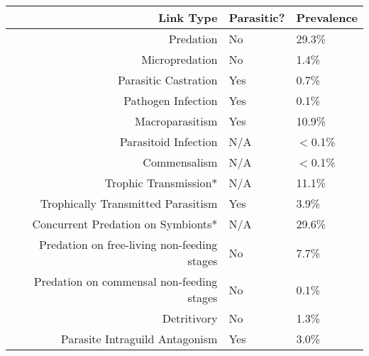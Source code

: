 \documentclass[/home/nkappler/Research/Dissertation/dissertation.tex]{subfiles}
\begin{document}
\begin{bibunit}
\begin{table}
    \centering
    \begin{tabular}{r l l}
        \toprule
        Link Type                                   & Parasitic?    & Prevalence\\
        \midrule
        Predation                                   & No            &29.3\%\\%
        Micropredation                              & No            &1.4\%\\%
        Parasitic Castration                        & Yes           &0.7\%\\%
        Pathogen Infection                          & Yes           &0.1\%\\%
        Macroparasitism                             & Yes           &10.9\%\\%
        Parasitoid Infection                        & N/A           &$<$0.1\%\\%
        Commensalism                                & N/A           &$<$0.1\%\\%
        Trophic Transmission*                       & N/A           &11.1\%\\%
        Trophically Transmitted Parasitism          & Yes           &3.9\%\\%
        Concurrent Predation on Symbionts*          & N/A           &29.6\%\\%
        Predation on free-living non-feeding stages & No            &7.7\%\\%
        Predation on commensal non-feeding stages   & No            &0.1\%\\%
        Detritivory                                 & No            &1.3\%\\%
        Parasite Intraguild Antagonism              & Yes           &3.0\%\\%

\end{tabular}
\end{table}
\end{bibunit}
\end{document}
